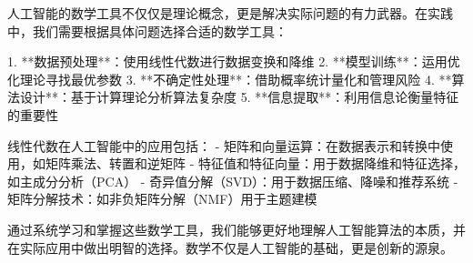 人工智能的数学工具不仅仅是理论概念，更是解决实际问题的有力武器。在实践中，我们需要根据具体问题选择合适的数学工具：

1. **数据预处理**：使用线性代数进行数据变换和降维
2. **模型训练**：运用优化理论寻找最优参数
3. **不确定性处理**：借助概率统计量化和管理风险
4. **算法设计**：基于计算理论分析算法复杂度
5. **信息提取**：利用信息论衡量特征的重要性

线性代数在人工智能中的应用包括：
- 矩阵和向量运算：在数据表示和转换中使用，如矩阵乘法、转置和逆矩阵
- 特征值和特征向量：用于数据降维和特征选择，如主成分分析（PCA）
- 奇异值分解（SVD）：用于数据压缩、降噪和推荐系统
- 矩阵分解技术：如非负矩阵分解（NMF）用于主题建模

通过系统学习和掌握这些数学工具，我们能够更好地理解人工智能算法的本质，并在实际应用中做出明智的选择。数学不仅是人工智能的基础，更是创新的源泉。

\nocite{*}
\printbibliography[heading=bibintoc, title=\ebibname]
\newpage
